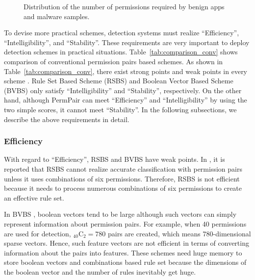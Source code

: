\documentclass{ieeeaccess}
\newcommand{\mytablename}{Table}
\begin{document}
\begin{figure}[t]
{  } 
  \caption{Distribution of the number of permissions required by benign apps and malware samples.}
  \label{fig:permission_distribution}
\end{figure}
To devise more practical schemes, detection systems must realize ``Efficiency'', ``Intelligibility'', and ``Stability''.
These requirements are very important to deploy detection schemes in practical situations.
\mytablename~\ref{tab:comparison_conv} shows comparison of conventional permission pairs based schemes.
As shown in \mytablename~\ref{tab:comparison_conv}, there exist strong points and weak points in every scheme \cite{liang2014permission, liu2014two, arora2019permpair}.
Rule Set Based Scheme (RSBS) \cite{liang2014permission} and Boolean Vector Based Scheme (BVBS) \cite{liu2014two} only satisfy ``Intelligibility'' and ``Stability'', respectively.
On the other hand, although PermPair \cite{arora2019permpair} can meet ``Efficiency'' and ``Intelligibility'' by using the two simple scores, it cannot meet ``Stability''.
In the following subsections, we describe the above requirements in detail.

\subsubsection{Efficiency}
With regard to ``Efficiency'', RSBS \cite{liang2014permission} and BVBS \cite{liu2014two} have weak points.
In \cite{liang2014permission}, it is reported that RSBS cannot realize accurate classification with permission pairs unless it uses combinations of six permissions.
Therefore, RSBS is not efficient because it needs to process numerous combinations of six permissions to create an effective rule set. 

In BVBS \cite{liu2014two}, boolean vectors tend to be large although such vectors can simply represent information about permission pairs.
For example, when 40 permissions are used for detection, ${}_{40}\mathrm{C}_2 = 780$ pairs are created, which means 780-dimensional sparse vectors.
Hence, such feature vectors are not efficient in terms of converting information about the pairs into features.
These schemes need huge memory to store boolean vectors and combinations based rule set because the dimensions of the boolean vector and the number of rules inevitably get huge.  
\end{document}
